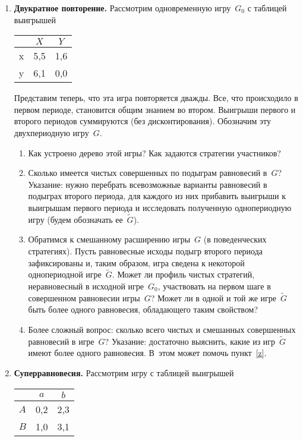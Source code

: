 \documentclass[a4paper,12pt]{article}
\begin{document}
\begin{enumerate}

\item {\bf Двукратное повторение.} Рассмотрим одновременную
игру~$G_0$ с таблицей выигрышей

\begin{center}
\begin{tabular}{|c|cc|}
\hline &$X$&$Y$\\ \hline x&5,5&1,6\\ y&6,1&0,0\\ \hline
\end{tabular}
\end{center}

Представим теперь, что эта игра повторяется дважды. Все,
что происходило в первом периоде, становится общим знанием
во втором. Выигрыши первого и второго периодов суммируются
(без дисконтирования). Обозначим эту двухпериодную
игру~$G$.

\begin{enumerate}

\item Как устроено дерево этой игры? Как задаются стратегии
участников?

\item Сколько имеется чистых совершенных по подыграм
равновесий в~$G$? Указание: нужно перебрать всевозможные
варианты равновесий в подыграх второго периода, для каждого
из них прибавить выигрыши к выигрышам первого периода и
исследовать полученную однопериодную игру (будем обозначать
ее~$\tilde G$).

\item\label{z} Обратимся к смешанному расширению игры~$G$
(в поведенческих стратегиях). Пусть равновесные исходы
подыгр второго периода зафиксированы и, таким образом, игра
сведена к некоторой однопериодной игре~$\tilde G$. Может ли
профиль чистых стратегий, неравновесный в исходной
игре~$G_0$, участвовать на первом шаге в совершенном
равновесии игры~$G$? Может ли в одной и той же игре~$\tilde
G$ быть более одного равновесия, обладающего таким
свойством?

\item Более сложный вопрос: сколько всего чистых и
смешанных совершенных равновесий в игре~$G$? Указание:
достаточно выяснить, какие из игр~$\tilde G$ имеют более
одного равновесия. В~этом может помочь пункт~\ref{z}.

\end{enumerate}

\item {\bf Суперравновесия.} Рассмотрим игру с таблицей
выигрышей \begin{center}
\begin{tabular}{|c|cc|}
\hline &$a$&$b$\\ \hline $A$&0,2&2,3\\ $B$&1,0&3,1\\ \hline
\end{tabular}
\end{center}


\end{enumerate}
\end{document}
